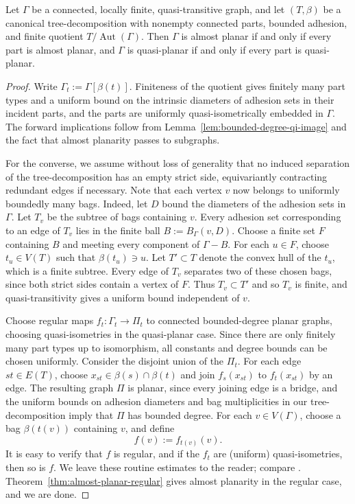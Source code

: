 \documentclass[a4paper]{amsart}
\begin{document}
\begin{lemma}\label{lem:planar-assembly}
Let $\Gamma$ be a connected, locally finite, quasi-transitive graph, and let $(T,\beta)$ be a canonical tree-decomposition with nonempty connected parts, bounded adhesion, and finite quotient $T/\operatorname{Aut}(\Gamma)$.
Then $\Gamma$ is almost planar if and only if every part is almost planar, and $\Gamma$ is quasi-planar if and only if every part is quasi-planar.
\end{lemma}

\begin{proof}
Write $\Gamma_t:=\Gamma[\beta(t)]$. Finiteness of the quotient gives finitely many part types and a uniform bound on the intrinsic diameters of adhesion sets in their incident parts, and the parts are uniformly quasi-isometrically embedded in $\Gamma$. The forward implications follow from Lemma~\ref{lem:bounded-degree-qi-image} and the fact that almost planarity passes to subgraphs.

For the converse, we assume without loss of generality that no induced separation of the tree-decomposition has an empty strict side, equivariantly contracting redundant edges if necessary.  
Note that each vertex $v$ now belongs to uniformly boundedly many bags. Indeed, let $D$ bound the diameters of the adhesion sets in $\Gamma$. Let $T_v$ be the subtree of bags containing $v$. Every adhesion set corresponding to an edge of $T_v$ lies in the finite ball $B:=B_\Gamma(v,D)$. Choose a finite set $F$ containing $B$ and meeting every component of $\Gamma-B$. For each $u \in F$, choose $t_u \in V(T)$ such that $\beta(t_u) \ni u$. Let $T' \subset T$ denote the convex hull of the $t_u$, which is a finite subtree. Every edge of $T_v$ separates two of these chosen bags, since both strict sides contain a vertex of $F$. Thus $T_v \subset T'$ and so $T_v$ is finite, and quasi-transitivity gives a uniform bound independent of $v$.

Choose regular maps $f_t:\Gamma_t\to \Pi_t$ to connected bounded-degree planar graphs, choosing quasi-isometries in the quasi-planar case. Since there are only finitely many part types up to isomorphism, all constants and degree bounds can be chosen uniformly. Consider the disjoint union of the $\Pi_t$. For each edge $st\in E(T)$, choose $x_{st}\in\beta(s)\cap\beta(t)$ and join $f_s(x_{st})$ to $f_t(x_{st})$ by an edge. The resulting graph $\Pi$ is planar, since every joining edge is a bridge, and the uniform bounds on adhesion diameters and bag multiplicities in our tree-decomposition imply that $\Pi$ has bounded degree.
For each $v\in V(\Gamma)$, choose a bag $\beta(t(v))$ containing $v$, and define
$$
f(v):=f_{t(v)}(v).
$$
It is easy to verify that $f$ is regular, and if the $f_t$ are (uniform) quasi-isometries, then so is $f$. We leave these routine estimates to the reader; compare \cite[Sec.~3]{Esperet_Giocanti_2024}. Theorem~\ref{thm:almost-planar-regular} gives almost planarity in the regular case, and we are done.
\end{proof}
\end{document}
